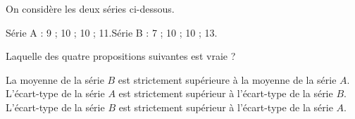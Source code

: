 
On considère les deux séries ci-dessous.

\smallskip

Série A : 9 ; 10 ; 10 ; 11.\qquad\qquad Série B : 7 ; 10 ; 10 ; 13.

\smallskip

Laquelle des quatre propositions suivantes est vraie ?

\smallskip

%
{La moyenne de la série $B$ est strictement supérieure à la moyenne de la série $A$.}%
{L'écart-type de la série $A$ est strictement supérieur à l'écart-type de la série $B$.}%
{L'écart-type de la série $B$ est strictement supérieur à l'écart-type de la série $A$.}%

